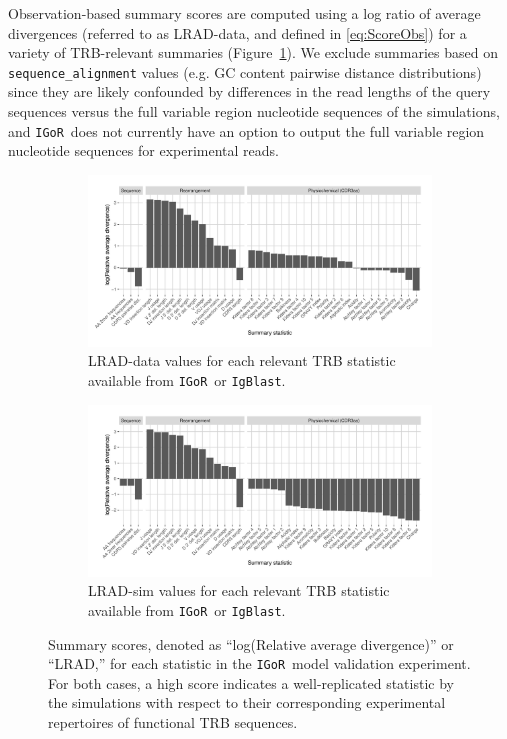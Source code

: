 \documentclass{article}
\newcommand{\igor}{\texttt{IGoR}}
\newcommand{\igblast}{\texttt{IgBlast}}
\begin{document}
Observation-based summary scores are computed using a log ratio of average divergences (referred to as LRAD-data, and defined in \eqref{eq:ScoreObs}) for a variety of TRB-relevant summaries (Figure~\ref{fig:ObsScoresTCR}). 
We exclude summaries based on \texttt{sequence\_alignment} values (e.g. GC content  pairwise distance distributions) since they are likely confounded by differences in the read lengths of the query sequences versus the full variable region nucleotide sequences of the simulations, and \igor\ does not currently have an option to output the full variable region nucleotide sequences for experimental reads.
\begin{figure}
	\begin{subfigure}{\textwidth}
    	\includegraphics[width=\linewidth]{Figures/IgorScores/obs_score_plot.pdf}
    	\caption{LRAD-data values for each relevant TRB statistic available from \igor\ or \igblast.
        }
    	\label{fig:ObsScoresTCR}
	\end{subfigure}
	\begin{subfigure}{\textwidth}
    	\includegraphics[width=\linewidth]{Figures/IgorScores/sim_score_plot.pdf}
    	\caption{LRAD-sim values for each relevant TRB statistic available from \igor\ or \igblast.
    	}
    	\label{fig:SimScoresTCR}
	\end{subfigure}
	\caption{Summary scores, denoted as ``log(Relative average divergence)'' or ``LRAD,'' for each statistic in the \igor\ model validation experiment. For both cases, a high score indicates a well-replicated statistic by the simulations with respect to their corresponding experimental repertoires of functional TRB sequences.}
	\label{fig:TCRScores}
\end{figure}
\end{document}
